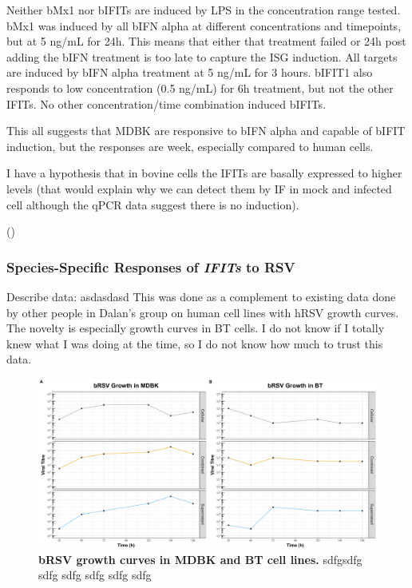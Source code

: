 Neither bMx1 nor bIFITs are induced by LPS in the concentration range tested. bMx1 was induced by all bIFN alpha at different concentrations and timepoints, but at 5 ng/mL for 24h. This means that either that treatment failed or 24h post adding the bIFN treatment is too late to capture the ISG induction. All targets are induced by bIFN alpha treatment at 5 ng/mL for 3 hours. bIFIT1 also responds to low concentration (0.5 ng/mL) for 6h treatment, but not the other IFITs. No other concentration/time combination induced bIFITs. 

This all suggests that MDBK are responsive to bIFN alpha and capable of bIFIT induction, but the responses are week, especially compared to human cells.

I have a hypothesis that in bovine cells the IFITs are basally expressed to higher levels  (that would explain why we can detect them by IF in mock and infected cell although the qPCR data suggest there is no induction).




(\cite{McClurkin1974ComparisonVirus})





\subsubsection{Species-Specific Responses of \textit{IFITs} to RSV} \label{Species-Specific Responses of IFITs to RSV}

 \label{Growth curves of bovine RSV in bovine cell lines}
Describe data: \newline
asdasdasd \newline
This was done as a complement to existing data done by other people in Dalan’s group on human cell lines with hRSV growth curves. The novelty is especially growth curves in BT cells. I do not know if I totally knew what I was doing at the time, so I do not know how much to trust this data.  

\begin{figure}
    \centering
    \includegraphics[width=1\linewidth]{07. Chapter 2/Figs/01. Technologies/01. growth_curves.pdf}
    \caption[bRSV growth curves in MDBK and BT cell lines.]{\textbf{bRSV growth curves in MDBK and BT cell lines.} sdfgsdfg sdfg sdfg sdfg sdfg sdfg }
    \label{bRSV growth curves in MDBK and BT cell lines}
\end{figure}


